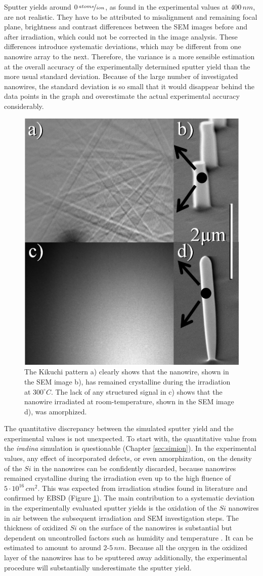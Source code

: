 Sputter yields around $0\,\nicefrac{atoms}{ion}$, as found in the experimental values at $400\,nm$, are not realistic. They have to be attributed to misalignment and remaining focal plane, brightness and contrast differences between the SEM images before and after irradiation, which could not be corrected in the image analysis. These differences introduce systematic deviations, which may be different from one nanowire array to the next. Therefore, the variance is a more sensible estimation at the overall accuracy of the experimentally determined sputter yield than the more usual standard deviation. Because of the large number of investigated nanowires, the standard deviation is so small that it would disappear behind the data points in the graph and overestimate the actual experimental accuracy considerably.

\begin{figure}
	\centering
		\includegraphics[width=.3\textwidth]{images/EBSD.jpg}
	\caption{The Kikuchi pattern a) clearly shows that the nanowire, shown in the SEM image b), has remained crystalline during the irradiation at $300^\circ C$. The lack of any structured signal in c) shows that the nanowire irradiated at room-temperature, shown in the SEM image d), was amorphized.} 
	\label{EBSD}
\end{figure}

The quantitative discrepancy between the simulated sputter yield and the experimental values is not unexpected. To start with, the quantitative value from the \emph{iradina} simulation is questionable (Chapter \ref{sec:simion}). In the experimental values, any effect of incorporated defects, or even amorphization, on the density of the $Si$ in the nanowires can be confidently discarded, because nanowires remained crystalline during the irradiation even up to the high fluence of $5\cdot 10^{16}\,cm^2$. This was expected from irradiation studies found in literature \cite{pelaz_ion-beam-induced_2004} and confirmed by EBSD (Figure \ref{EBSD}). The main contribution to a systematic deviation in the experimentally evaluated sputter yields is the oxidation of the $Si$ nanowires in air between the subsequent irradiation and SEM investigation steps. The thickness of oxidized $Si$ on the surface of the nanowires is substantial but dependent on uncontrolled factors such as humidity and temperature \cite{lukes_oxidation_1972,al-bayati_composition_1991}. It can be estimated to amount to around $2$-$5\,nm$. Because all the oxygen in the oxidized layer of the nanowires has to be sputtered away additionally, the experimental procedure will substantially underestimate the sputter yield.


